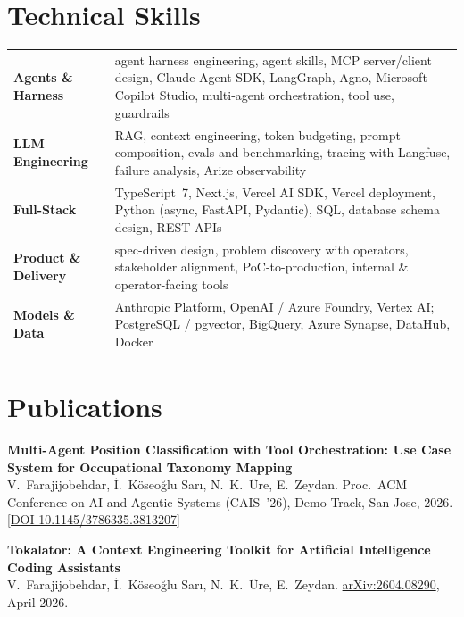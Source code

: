 \documentclass[10pt,a4paper]{article}
\begin{document}
\section{Technical Skills}
\begin{tabularx}{\textwidth}{@{}>{\bfseries}l X@{}}
  Agents \& Harness & agent harness engineering, agent skills, MCP server/client design, Claude Agent SDK, LangGraph, Agno,
                      Microsoft Copilot Studio, multi-agent orchestration, tool use, guardrails \\[1pt]
  LLM Engineering   & RAG, context engineering, token budgeting, prompt composition, evals and benchmarking,
                      tracing with Langfuse, failure analysis, Arize observability \\[1pt]
  Full-Stack        & TypeScript~7, Next.js, Vercel AI SDK, Vercel deployment, Python (async, FastAPI, Pydantic), SQL,
                      database schema design, REST APIs \\[1pt]
  Product \& Delivery & spec-driven design, problem discovery with operators, stakeholder alignment,
                      PoC-to-production, internal \& operator-facing tools \\[1pt]
  Models \& Data    & Anthropic Platform, OpenAI / Azure Foundry, Vertex AI; PostgreSQL / pgvector, BigQuery,
                      Azure Synapse, DataHub, Docker \\
\end{tabularx}

\section{Publications}
\textbf{Multi-Agent Position Classification with Tool Orchestration: Use Case System for Occupational Taxonomy Mapping}\\
V.~Farajijobehdar, \.I.~Köseoğlu Sar\i, N.~K.~\"Ure, E.~Zeydan. Proc.\ ACM Conference on AI and Agentic Systems
(CAIS~'26), Demo Track, San Jose, 2026.
\href{https://doi.org/10.1145/3786335.3813207}{[DOI 10.1145/3786335.3813207]}

\vspace{3pt}
\textbf{Tokalator: A Context Engineering Toolkit for Artificial Intelligence Coding Assistants}\\
V.~Farajijobehdar, \.I.~Köseoğlu Sar\i, N.~K.~\"Ure, E.~Zeydan. \href{https://arxiv.org/abs/2604.08290}{arXiv:2604.08290}, April 2026.
\end{document}
